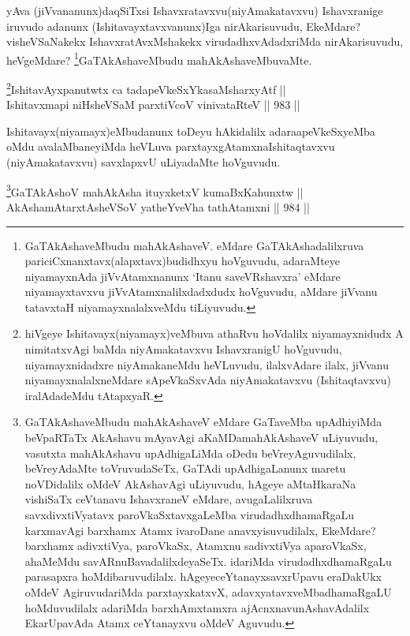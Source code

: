 \begin{artha}
yAva (jiVvananunx)daqSiTxsi Ishavxratavxvu(niyAmakatavxvu) Ishavxranige iruvudo adanunx (Ishitavayxtavxvanunx)Iga nirAkarisuvudu, EkeMdare? visheVSaNakekx IshavxratAvxMshakekx virudadhxvAdadxriMda nirAkarisuvudu, heVgeMdare? \footnote{GaTAkAshaveMbudu mahAkAshaveV. eMdare GaTAkAshadalilxruva pariciCxnanxtavx(alapxtavx)budidhxyu hoVguvudu, adaraMteye niyamayxnAda jiVvAtamxnanunx `Itanu saveVRshavxra' eMdare niyamayxtavxvu jiVvAtamxnalilxdadxdudx hoVguvudu, aMdare jiVvanu tatavxtaH niyamayxnalalxveMdu tiLiyuvudu.}GaTAkAshaveMbudu mahAkAshaveMbuvaMte.
\end{artha}


\begin{shl}
\footnote{hiVgeye Ishitavayx(niyamayx)veMbuva athaRvu hoVdalilx niyamayxnidudx A nimitatxvAgi baMda niyAmakatavxvu IshavxranigU hoVguvudu, niyamayxnidadxre niyAmakaneMdu heVLuvudu, ilalxvAdare ilalx, jiVvanu niyamayxnalalxneMdare sApeVkaSxvAda niyAmakatavxvu (Ishitaqtavxvu) iralAdadeMdu tAtapxyaR.}IshitavAyxpanutwtx ca tadapeVkeSxYkasaMsharxyAtf || \\
Ishitavxmapi niHsheVSaM parxtiVcoV vinivataRteV \hfill || 983 ||  
\end{shl}

\begin{artha}
Ishitavayx(niyamayx)eMbudanunx toDeyu hAkidalilx adara\break apeVkeSxyeMba oMdu avalaMbaneyiMda heVLuva parxtayxgAtamxna\break Ishitaqtavxvu (niyAmakatavxvu) savxlapxvU uLiyadaMte hoVguvudu.
\end{artha}

\begin{shl}
\footnote{GaTAkAshaveMbudu mahAkAshaveV eMdare GaTaveMba upAdhiyiMda beVpaRTaTx AkAshavu mAyavAgi aKaMDamahAkAshaveV uLiyuvudu, vasutxta mahAkAshavu upAdhigaLiMda oDedu beVreyAguvudilalx, beVreyAdaMte toVruvudaSeTx, GaTAdi upAdhigaLanunx maretu noVDidalilx oMdeV AkAshavAgi uLiyuvudu, hAgeye aMtaHkaraNa vishiSaTx ceVtanavu IshavxraneV eMdare, avugaLalilxruva savxdivxtiVyatavx paroVkaSxtavxgaLeMba virudadhxdhamaRgaLu karxmavAgi barxhamx Atamx ivaroDane anavxyisuvudilalx, EkeMdare? barxhamx adivxtiVya, paroVkaSx, Atamxnu sadivxtiVya aparoVkaSx, ahaMeMdu savARnuBavadalilxdeyaSeTx. idariMda virudadhxdhamaRgaLu parasapxra hoMdibaruvudilalx. hAgeye\break ceYtanayxsavxrUpavu eraDakUkx oMdeV AgiruvudariMda parxtayxkatxvX, adavxyatavxveMbadhamaRgaLU hoMduvudilalx adariMda barxhAmxtamxra ajAcnxnavunAshavAdalilx EkarUpavAda Atamx ceYtanayxvu oMdeV Aguvudu.}GaTAkAshoV mahAkAsha ituyxketxV kumaBxKahunxtw || \\
AkAshamAtarxtAsheVSoV yatheYveVha tathA\s \s tamxni \hfill || 984 ||  
\end{shl}

